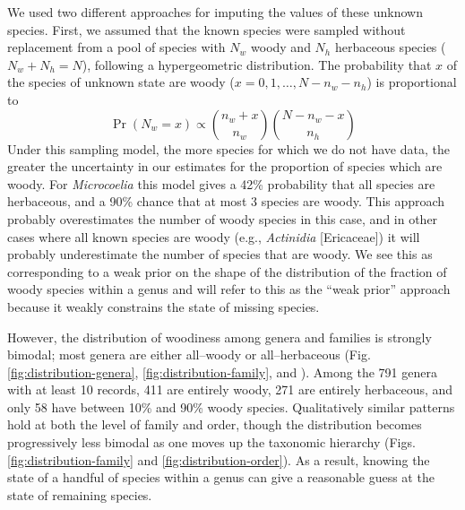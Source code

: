 \documentclass[a4paper,12pt]{article}
\begin{document}
We used two different approaches for imputing the values of these
unknown species. First, we assumed that the known species were sampled
without replacement from a pool of species with $N_w$ woody and $N_h$
herbaceous species ($N_w + N_h = N$), following a hypergeometric
distribution. The probability that $x$ of the species of unknown state
are woody ($x = 0, 1, \ldots, N - n_w - n_h$) is proportional to
\begin{equation}
  \Pr(N_w = x) \propto {n_w + x \choose n_w}
  {N - n_w - x \choose n_h}
\end{equation}
Under this sampling model, the more species for which we do not have data,
the greater the uncertainty in our estimates for the proportion of species
which are woody.
%
For \textit{Microcoelia} this model gives a 42\% probability that all
species are herbaceous, and a 90\% chance that at most 3 species
are woody.
This approach probably overestimates the number of woody species in
this case, and in other cases where all known species are woody (e.g.,
\textit{Actinidia} [Ericaceae]) it will probably underestimate the
number of species that are woody. We see this as corresponding to a
weak prior on the shape of the distribution of the fraction of woody
species within a genus and will refer to this as the ``weak prior''
approach because it weakly constrains the state of missing species.

However, the distribution of woodiness among genera and families is
strongly bimodal; most genera are either all--woody or all--herbaceous
(Fig. \ref{fig:distribution-genera}, \ref{fig:distribution-family}, and 
\citealt{sinnott1915evolution}).  Among the 791 genera with at least 10
records, 411 are entirely woody, 271 are entirely herbaceous, and only
58 have between 10\% and 90\% woody species. Qualitatively similar patterns
hold at both the level of family and order, though the distribution
becomes progressively less bimodal as one moves up the taxonomic hierarchy 
(Figs. \ref{fig:distribution-family} and \ref{fig:distribution-order}). 
As a result, knowing the state of a handful of species within a genus 
can give a reasonable guess at the state of remaining species.
\end{document}
